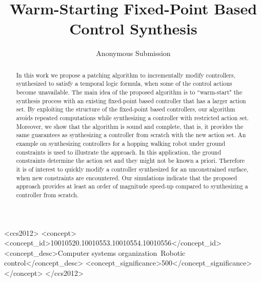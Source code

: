 \documentclass[sigconf]{acmart}
\begin{document}
\title{Warm-Starting Fixed-Point Based Control Synthesis}


\author{Anonymous Submission}

\renewcommand{\shortauthors}{Anonymous et al.}


\begin{abstract}
 In this work we propose a patching algorithm to incrementally modify controllers, synthesized to satisfy a temporal logic formula, when some of the control actions become unavailable. The main idea of the proposed algorithm is to ``warm-start" the synthesis process with an existing fixed-point based controller that has a larger action set. 
By exploiting the structure of the fixed-point based controllers, our algorithm avoids repeated computations while synthesizing a controller with restricted action set. Moreover, we show that the algorithm is sound and complete, that is, it provides the same guarantees as synthesizing a controller from scratch with the new action set.    
An example on synthesizing controllers for a hopping {\color{purple} walking} robot under ground constraints is used to illustrate the approach. In this application, the ground constraints determine the action set and they might not be known a priori. Therefore it is of interest to quickly modify a controller synthesized for an unconstrained surface, when new constraints are encountered. Our simulations indicate that the proposed approach provides at least an order of magnitude speed-up compared to synthesizing a controller from scratch.
\end{abstract}

%
%
\begin{CCSXML}
<ccs2012>
<concept>
<concept_id>10010520.10010553.10010554.10010556</concept_id>
<concept_desc>Computer systems organization~Robotic control</concept_desc>
<concept_significance>500</concept_significance>
</concept>
</ccs2012>
\end{CCSXML}






\maketitle







\appendix

\end{document}
